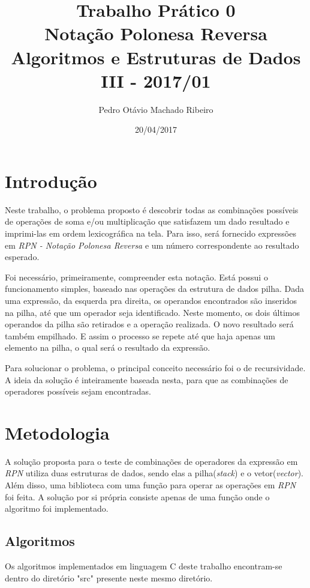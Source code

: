 \documentclass[
12pt,
a4paper,
twoside,
brazil
]{article}
\author{Pedro Otávio Machado Ribeiro}
\title{Trabalho Prático 0\\Notação Polonesa Reversa\\Algoritmos e Estruturas de Dados III - 2017/01}
\date{20/04/2017}
\begin{document}
	
	\maketitle
	
	\section{Introdução}
	
	Neste trabalho, o problema proposto é descobrir todas as combinações possíveis de operações de soma e/ou multiplicação que satisfazem um dado resultado e imprimi-las em ordem lexicográfica na tela. Para isso, será fornecido expressões em \textit{RPN - Notação Polonesa Reversa} e um número correspondente ao resultado esperado.
	
	Foi necessário, primeiramente, compreender esta notação. Está possui o funcionamento simples, baseado nas operações da estrutura de dados pilha. Dada uma expressão, da esquerda pra direita, os operandos encontrados são inseridos na pilha, até que um operador seja identificado. Neste momento, os dois últimos operandos da pilha são retirados e a operação realizada. O novo resultado será também empilhado. E assim o processo se repete até que haja apenas um elemento na pilha, o qual será o resultado da expressão.
	
	Para solucionar o problema, o principal conceito necessário foi o de recursividade. A ideia da solução é inteiramente baseada nesta, para que as combinações de operadores possíveis sejam encontradas.
	
	\section{Metodologia}
	
	A solução proposta para o teste de combinações de operadores da expressão em \textit{RPN} utiliza duas estruturas de dados, sendo elas a pilha(\textit{stack}) e o vetor(\textit{vector}). Além disso, uma biblioteca com uma função para operar as operações em \textit{RPN} foi feita. A solução por si própria consiste apenas de uma função onde o algoritmo foi implementado.
	
	\subsection{Algoritmos}
	
	Os algoritmos implementados em linguagem C deste trabalho encontram-se dentro do diretório "src" presente neste mesmo diretório.
	
\end{document}
